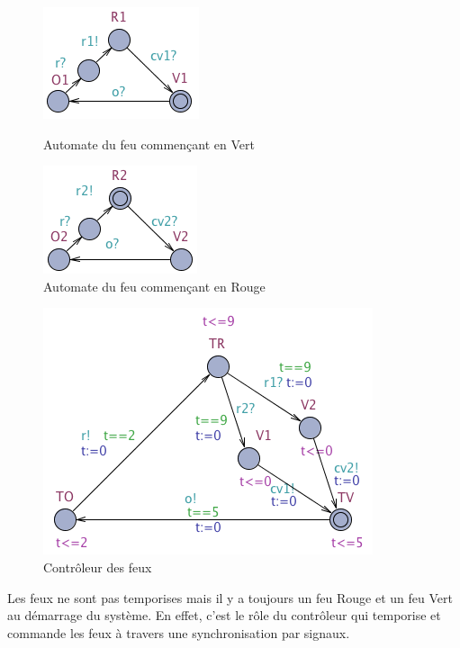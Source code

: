\documentclass[pdftex,12pt,a4paper]{article}
\begin{document}
\begin{figure}[h]
    \begin{minipage}[c]{.46\linewidth}
		\centering
		\includegraphics[scale=0.5]{ressources/part2/Q8-1.png}
		\caption{Automate du feu commençant en Vert}
    \end{minipage}
    \hfill%
    \begin{minipage}[c]{.46\linewidth}
		\centering
		\includegraphics[scale=0.5]{ressources/part2/Q8-2.png}
		\caption{Automate du feu commençant en Rouge}
    \end{minipage}
\end{figure}

\begin{figure}[H]
	\centering
	\includegraphics[scale=0.5]{ressources/part2/Q8-3.png}
	\caption{Contrôleur des feux}
\end{figure}

Les feux ne sont pas temporises mais il y a toujours un feu Rouge et un feu Vert au démarrage du système. En effet, c'est le rôle du contrôleur qui temporise et commande les feux à travers une synchronisation par signaux.
\end{document}
